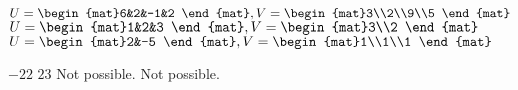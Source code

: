 \begin{Exercise}[
name={},
title={}, 
difficulty=0,
origin={\cite{GH}}]
\begin{multicols}{2}
\Question $U=\begin{mat}6&2&-1&2  \end{mat}, \\ V=\begin{mat}3\\2\\9\\5 \end{mat}$
\Question $U=\begin{mat}1&2&3  \end{mat}, \\ V=\begin{mat}3\\2 \end{mat}$
\Question $U=\begin{mat}2&-5  \end{mat}, \\ V=\begin{mat}1\\1\\1 \end{mat}$
\EndCurrentQuestion
\end{multicols}

\end{Exercise}

\begin{Answer}
\Question $-22$
\Question $23$
\Question Not possible.
\Question Not possible.
\end{Answer}

